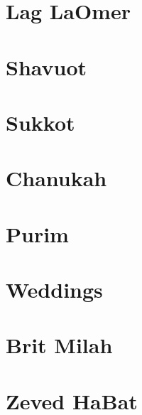 \documentclass[letterpaper]{memoir}
\newcommand{\song}[2]{}
\begin{document}
\chapter{Lag LaOmer}
\song{V'amartem Ko Lachai}{Vamartem_Ko_Lachai.pdf}

\chapter{Shavuot}
\song{Roe' Ne'eman Hu}{Roe_Neeman_Hu.pdf}
\song{T'nu Kavod LaTorah}{Tnu_Kavod_LaTorah.pdf}

\chapter{Sukkot}
\song{Sukkah v'Lulav (Moroccan)}{Sukkah_vLulav_Moroccan.pdf}
\song{Sukkah v'Lulav (Yerushalmi)}{Sukkah_vLulav_Yerushalmi.pdf}
\song{Chanun Rachem}{Chanun_Rachem.pdf}
\song{Yah Et Sukkat David Takim}{Yah_Et_Sukkat_David_Takim.pdf}
\song{Nizke l'kol Berachot}{Nizke_lkol_Berachot.pdf}

\chapter{Chanukah}
\song{Yah Hatzel Yonah}{Yah_Hatzel_Yonah.pdf}
\song{Heichalo Heichalo}{Heichalo_Heichalo.pdf}
\song{L'neri}{Lneri.pdf}
\song{Am Ne'emanai}{Am_Neemanai.pdf}

\chapter{Purim}
\song{Ronu Gilu}{Ronu_Gilu.pdf}
\song{Or Gilah}{Or_Gilah.pdf} %
\song{El Melech Ne'eman}{El_Melech_Neeman.pdf}
\song{Ezer Mitzarai}{Ezer_Mitzarai.pdf}
\song{Simeni Rosh}{Simeni_Rosh.pdf}
\song{Chish Misgabi Geulah}{Chish_Misgabi_Geulah.pdf}
\song{Eli Tzur Yishuati}{Eli_Tzur_Yishuati.pdf}

\chapter{Weddings}
\song{Yismach Hatani}{Yismach_Hatani.pdf}
\song{El Me'od Na'alah}{El_Meod_Naalah.pdf}
\song{Im Chacham Libecha Beni}{Im_Chacham_Libecha_Beni.pdf}
\song{Makhelot Am}{Makhelot_Am.pdf}
\song{Ya'alah Ya'alah}{Yaalah_Yaalah.pdf}
\song{Et Dodim Kalah}{Et_Dodim_Kalah.pdf}

\chapter{Brit Milah}
\song{Mah Tov Mah Na'im}{Mah_Tov_Mah_Naim.pdf}
\song{Yehi Shalom b'Cheleinu (Yerushalmi)}{Yehi_Shalom_bCheleinu_Yerushalmi.pdf}
\song{Yehi Shalom B'Cheleinu (Syrian)}{Yehi_Shalom_bCheleinu_Syrian.pdf}

\chapter{Zeved HaBat}
\song{Nava Yafa Tz'viyah}{Nava_Yafa_Tzviyah.pdf}
\end{document}
